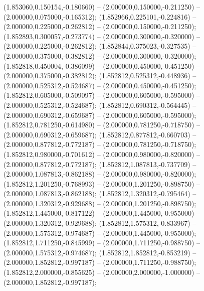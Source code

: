  (1.853060,0.150154,-0.180660) -- (2.000000,0.150000,-0.211250) -- (2.000000,0.075000,-0.165312);
 (1.852966,0.225101,-0.224816) -- (2.000000,0.225000,-0.262812) -- (2.000000,0.150000,-0.211250);
 (1.852893,0.300057,-0.273774) -- (2.000000,0.300000,-0.320000) -- (2.000000,0.225000,-0.262812);
 (1.852844,0.375023,-0.327535) -- (2.000000,0.375000,-0.382812) -- (2.000000,0.300000,-0.320000);
 (1.852818,0.450004,-0.386099) -- (2.000000,0.450000,-0.451250) -- (2.000000,0.375000,-0.382812);
 (1.852812,0.525312,-0.448936) -- (2.000000,0.525312,-0.524687) -- (2.000000,0.450000,-0.451250);
 (1.852812,0.605000,-0.509097) -- (2.000000,0.605000,-0.595000) -- (2.000000,0.525312,-0.524687);
 (1.852812,0.690312,-0.564445) -- (2.000000,0.690312,-0.659687) -- (2.000000,0.605000,-0.595000);
 (1.852812,0.781250,-0.614980) -- (2.000000,0.781250,-0.718750) -- (2.000000,0.690312,-0.659687);
 (1.852812,0.877812,-0.660703) -- (2.000000,0.877812,-0.772187) -- (2.000000,0.781250,-0.718750);
 (1.852812,0.980000,-0.701612) -- (2.000000,0.980000,-0.820000) -- (2.000000,0.877812,-0.772187);
 (1.852812,1.087813,-0.737709) -- (2.000000,1.087813,-0.862188) -- (2.000000,0.980000,-0.820000);
 (1.852812,1.201250,-0.768993) -- (2.000000,1.201250,-0.898750) -- (2.000000,1.087813,-0.862188);
 (1.852812,1.320312,-0.795464) -- (2.000000,1.320312,-0.929688) -- (2.000000,1.201250,-0.898750);
 (1.852812,1.445000,-0.817122) -- (2.000000,1.445000,-0.955000) -- (2.000000,1.320312,-0.929688);
 (1.852812,1.575312,-0.833967) -- (2.000000,1.575312,-0.974687) -- (2.000000,1.445000,-0.955000);
 (1.852812,1.711250,-0.845999) -- (2.000000,1.711250,-0.988750) -- (2.000000,1.575312,-0.974687);
 (1.852812,1.852812,-0.853219) -- (2.000000,1.852812,-0.997187) -- (2.000000,1.711250,-0.988750);
 (1.852812,2.000000,-0.855625) -- (2.000000,2.000000,-1.000000) -- (2.000000,1.852812,-0.997187);
